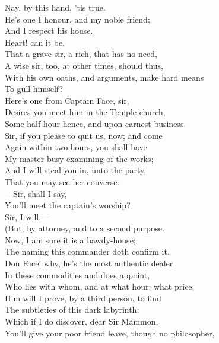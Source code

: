 \documentclass[a4paper,oneside,12pt]{memoir}
\begin{document}
\begin{drama*}
\mammonspeaks {} Nay, by this hand, 'tis true.\\
He's one I honour, and my noble friend;\\
And I respect his house.\\
\surlyspeaks {} Heart! can it be,\\
That a grave sir, a rich, that has no need,\\
A wise sir, too, at other times, should thus,\\
With his own oaths, and arguments, make hard means\\
To gull himself?\\
\facespeaks {}  Here's one from Captain Face, sir,\\
Desires you meet him in the Temple-church,\\
Some half-hour hence, and upon earnest business.\\
Sir, if you please to quit us, now; and come\\
Again within two hours, you shall have\\
My master busy examining of the works;\\
And I will steal you in, unto the party,\\
That you may see her converse.\\
 ---Sir, shall I say,\\
You'll meet the captain's worship?\\
\surlyspeaks {} Sir, I will.---\\
(But, by attorney, and to a second purpose.\\
Now, I am sure it is a bawdy-house;\\
The naming this commander doth confirm it.\\
Don Face! why, he's the most authentic dealer\\
In these commodities and does appoint,\\
Who lies with whom, and at what hour; what price;\\
Him will I prove, by a third person, to find\\
The subtleties of this dark labyrinth:\\
Which if I do discover, dear Sir Mammon,\\
You'll give your poor friend leave, though no philosopher,\\

\end{drama*}
\end{document}
